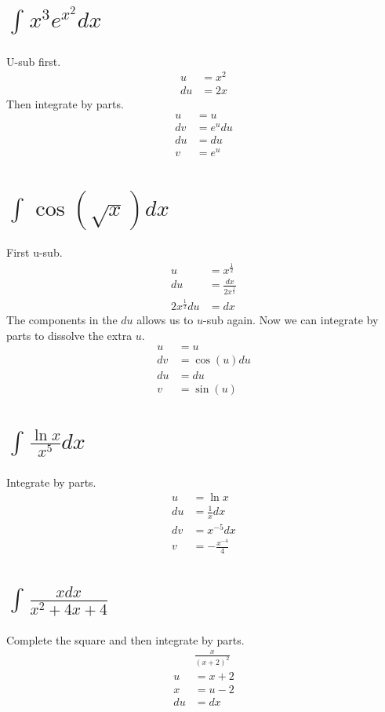 \documentclass[letterpaper, 12pt]{article}
\begin{document}
\section{$\int_{ }^{ }x^{3}e^{x^{2}}dx$}
U-sub first.
\begin{align}
    u  & =x^{2} \\
    du & =2x
\end{align}
Then integrate by parts.
\begin{align}
    u  & =u       \\
    dv & =e^{u}du \\
    du & =du      \\
    v  & =e^{u}
\end{align}
\setcounter{equation}{0}
\section{$
      \int_{ }^{ }\cos\left(\sqrt{x}\right)dx
  $}
First u-sub.
\begin{align}
    u                  & =x^{\frac{1}{2}}             \\
    du                 & =\frac{dx}{2x^{\frac{1}{2}}} \\
    2x^{\frac{1}{2}}du & =dx
\end{align}
The components in the $du$ allows us to $u$-sub again. Now we can integrate by parts to dissolve the extra $u$.
\begin{align}
    u  & =u                    \\
    dv & =\cos\left(u\right)du \\
    du & =du                   \\
    v  & =\sin\left(u\right)
\end{align}
\setcounter{equation}{0}
\section{$
      \int_{ }^{ }\frac{\ln x}{x^{5}}dx
  $}
Integrate by parts.
\begin{align}
    u  & =\ln x             \\
    du & =\frac{1}{x}dx     \\
    dv & =x^{-5}dx          \\
    v  & =-\frac{x^{-4}}{4}
\end{align}
\setcounter{equation}{0}
\section{$
      \int_{ }^{ }\frac{xdx}{x^{2}+4x+4}
  $}
Complete the square and then integrate by parts.
\begin{align}
       & \frac{x}{\left(x+2\right)^{2}} \\
    u  & =x+2                           \\
    x  & =u-2                           \\
    du & =dx
\end{align}
\setcounter{equation}{0}
\end{document}
